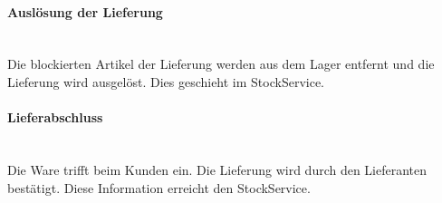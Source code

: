 \paragraph*{Auslösung der Lieferung} \mbox{}\\
Die blockierten Artikel der Lieferung werden aus dem Lager entfernt und die Lieferung wird ausgelöst. Dies geschieht im StockService.

\paragraph*{Lieferabschluss} \mbox{}\\
Die Ware trifft beim Kunden ein. Die Lieferung wird durch den Lieferanten bestätigt. Diese Information erreicht den StockService.
